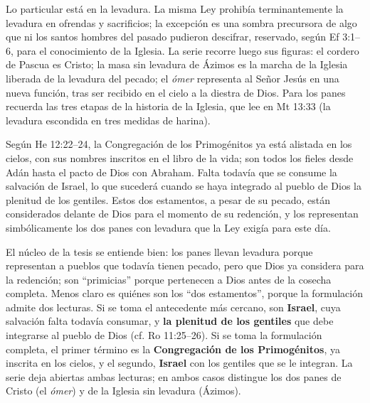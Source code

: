 \documentclass[11pt,letterpaper]{article}
\newcommand{\destacar}[1]{\textbf{\textcolor{tierraroja}{#1}}}
\begin{document}
Lo particular está en la levadura. La misma Ley prohibía terminantemente la levadura en ofrendas y sacrificios; la excepción es una sombra precursora de algo que ni los santos hombres del pasado pudieron descifrar, reservado, según Ef 3:1--6, para el conocimiento de la Iglesia. La serie recorre luego sus figuras: el cordero de Pascua es Cristo; la masa sin levadura de Ázimos es la marcha de la Iglesia liberada de la levadura del pecado; el \emph{ómer} representa al Señor Jesús en una nueva función, tras ser recibido en el cielo a la diestra de Dios. Para los panes recuerda las tres etapas de la historia de la Iglesia, que lee en Mt 13:33 (la levadura escondida en tres medidas de harina).

Según He 12:22--24, la Congregación de los Primogénitos ya está alistada en los cielos, con sus nombres inscritos en el libro de la vida; son todos los fieles desde Adán hasta el pacto de Dios con Abraham. Falta todavía que se consume la salvación de Israel, lo que sucederá cuando se haya integrado al pueblo de Dios la plenitud de los gentiles. Estos dos estamentos, a pesar de su pecado, están considerados delante de Dios para el momento de su redención, y los representan simbólicamente los dos panes con levadura que la Ley exigía para este día.

El núcleo de la tesis se entiende bien: los panes llevan levadura porque representan a pueblos que todavía tienen pecado, pero que Dios ya considera para la redención; son ``primicias'' porque pertenecen a Dios antes de la cosecha completa. Menos claro es quiénes son los ``dos estamentos'', porque la formulación admite dos lecturas. Si se toma el antecedente más cercano, son \destacar{Israel}, cuya salvación falta todavía consumar, y \destacar{la plenitud de los gentiles} que debe integrarse al pueblo de Dios (cf. Ro 11:25--26). Si se toma la formulación completa, el primer término es la \destacar{Congregación de los Primogénitos}, ya inscrita en los cielos, y el segundo, \destacar{Israel} con los gentiles que se le integran. La serie deja abiertas ambas lecturas; en ambos casos distingue los dos panes de Cristo (el \emph{ómer}) y de la Iglesia sin levadura (Ázimos).
\end{document}
